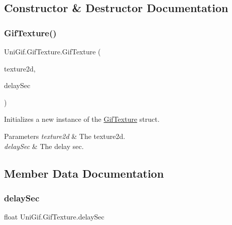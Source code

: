 \subsection{Constructor \& Destructor Documentation}
\mbox{\label{struct_uni_gif_1_1_gif_texture_a1e46beef96f4ceb278e1a6430837fda1}} 
\subsubsection{\texorpdfstring{Gif\+Texture()}{GifTexture()}}
{\footnotesize\ttfamily Uni\+Gif.\+Gif\+Texture.\+Gif\+Texture (\begin{DoxyParamCaption}\item[{Texture2D}]{texture2d,  }\item[{float}]{delay\+Sec }\end{DoxyParamCaption})\hspace{0.3cm}{\ttfamily [inline]}}



Initializes a new instance of the \hyperlink{struct_uni_gif_1_1_gif_texture}{Gif\+Texture} struct. 


\begin{DoxyParams}{Parameters}
{\em texture2d} & The texture2d.\\
\hline
{\em delay\+Sec} & The delay sec.\\
\hline
\end{DoxyParams}


\subsection{Member Data Documentation}
\mbox{\label{struct_uni_gif_1_1_gif_texture_a319318dbe2d1f2d8ad53e4125e658f54}} 
\subsubsection{\texorpdfstring{delay\+Sec}{delaySec}}
{\footnotesize\ttfamily float Uni\+Gif.\+Gif\+Texture.\+delay\+Sec}



